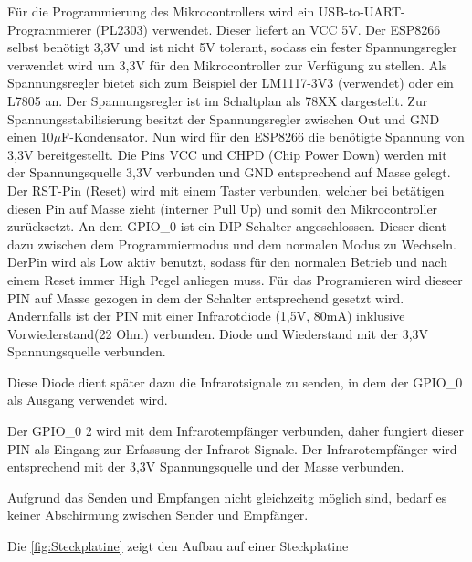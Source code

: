 Für die Programmierung des Mikrocontrollers wird ein USB-to-UART-Programmierer (PL2303) verwendet.
Dieser liefert an VCC 5V.
Der ESP8266 selbst benötigt 3,3V und ist nicht 5V tolerant, sodass ein fester Spannungsregler verwendet wird um 3,3V für den Mikrocontroller zur Verfügung zu stellen.
Als Spannungsregler bietet sich zum Beispiel der LM1117-3V3 (verwendet) oder ein L7805 an.
Der Spannungsregler ist im Schaltplan als 78XX dargestellt.
Zur Spannungsstabilisierung besitzt der Spannungsregler zwischen Out und GND einen 10$\mu$F-Kondensator.
Nun wird für den ESP8266 die benötigte Spannung von 3,3V bereitgestellt.
Die Pins VCC und CHPD (Chip Power Down) werden mit der Spannungsquelle 3,3V verbunden und GND entsprechend auf Masse gelegt.
Der RST-Pin (Reset) wird mit einem Taster verbunden, welcher bei betätigen diesen Pin auf Masse zieht (interner Pull Up) und somit den Mikrocontroller zurücksetzt.
An dem GPIO\_0 ist ein DIP Schalter angeschlossen.
Dieser dient dazu zwischen dem Programmiermodus und dem normalen Modus zu Wechseln.
DerPin wird als Low aktiv benutzt, sodass für den normalen Betrieb und nach einem Reset immer High Pegel anliegen muss.
Für das Programieren wird dieseer PIN auf Masse gezogen in dem der Schalter entsprechend gesetzt wird.
Andernfalls ist der PIN mit einer Infrarotdiode (1,5V, 80mA) inklusive Vorwiederstand(22 Ohm) verbunden.
Diode und Wiederstand mit der 3,3V Spannungsquelle verbunden.

Diese Diode dient später dazu die Infrarotsignale zu senden, in dem der GPIO\_0 als Ausgang verwendet wird.

Der GPIO\_0 2 wird mit dem Infrarotempfänger verbunden, daher fungiert dieser PIN als Eingang zur Erfassung der Infrarot-Signale.
Der Infrarotempfänger wird entsprechend mit der 3,3V Spannungsquelle und der Masse verbunden.

Aufgrund das Senden und Empfangen nicht gleichzeitg möglich sind, bedarf es keiner Abschirmung zwischen Sender und Empfänger.

Die \autoref{fig:Steckplatine} zeigt den Aufbau auf einer Steckplatine


